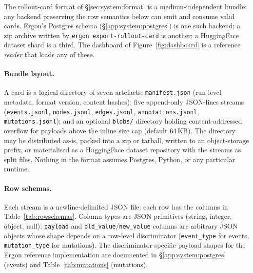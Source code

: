 \documentclass{article}
\begin{document}
The rollout-card format of \S\ref{sec:system:format} is a
medium-independent bundle: any backend preserving the row
semantics below can emit and consume valid cards. Ergon's
Postgres schema (\S\ref{app:system:postgres}) is one such
backend; a zip archive written by
\texttt{ergon export-rollout-card} is another; a HuggingFace
dataset shard is a third. The dashboard of
Figure~\ref{fig:dashboard} is a reference \emph{reader} that
loads any of these.

\paragraph{Bundle layout.} A card is a logical directory of
seven artefacts: \texttt{manifest.json} (run-level metadata,
format version, content hashes); five append-only JSON-lines
streams (\texttt{events.jsonl}, \texttt{nodes.jsonl},
\texttt{edges.jsonl}, \texttt{annotations.jsonl},
\texttt{mutations.jsonl}); and an optional \texttt{blobs/}
directory holding content-addressed overflow for payloads above
the inline size cap (default 64\,KB). The directory may be
distributed as-is, packed into a zip or tarball, written to an
object-storage prefix, or materialised as a HuggingFace dataset
repository with the streams as split files. Nothing in the
format assumes Postgres, Python, or any particular runtime.

\paragraph{Row schemas.} Each stream is a newline-delimited JSON
file; each row has the columns in Table~\ref{tab:rowschemas}.
Column types are JSON primitives (string, integer, object,
null); \texttt{payload} and
\texttt{old\_value}/\texttt{new\_value} columns are arbitrary
JSON objects whose shape depends on a row-level discriminator
(\texttt{event\_type} for events, \texttt{mutation\_type} for
mutations). The discriminator-specific payload shapes for the
Ergon reference implementation are documented in
\S\ref{app:system:postgres} (events) and
Table~\ref{tab:mutations} (mutations).
\end{document}
